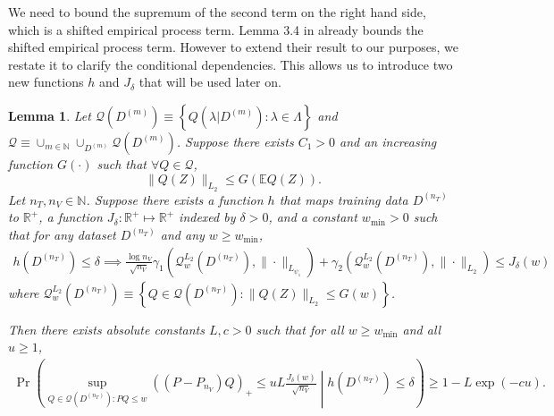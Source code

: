 \documentclass[10pt]{book}
\newtheorem{lemma}{Lemma}
\theoremstyle{definition}
\begin{document}
We need to bound the supremum of the second term on the right hand side, which is a shifted empirical process term.
Lemma 3.4 in \citet{lecue2012oracle} already bounds the shifted empirical process term.
However to extend their result to our purposes, we restate it to clarify the conditional dependencies.
This allows us to introduce two new functions $h$ and $J_\delta$ that will be used later on.
\begin{lemma}
Let $\mathcal{Q}(D^{(m)})\equiv\left\{ Q(\lambda|D^{(m)}):\lambda\in\Lambda\right\} $
and $\mathcal{Q}\equiv\cup_{m\in\mathbb{N}}\cup_{D^{(m)}}\mathcal{Q}(D^{(m)})$.
Suppose there exists $C_{1}>0$ and an increasing function $G(\cdot)$
such that $\forall Q\in\mathcal{Q}$, 
\[
\|Q(Z)\|_{L_{2}}\le G\left(\mathbb{E}Q(Z)\right).
\]
Let $n_{T},n_{V}\in\mathbb{N}$.
Suppose there exists a function $h$ that maps training data $D^{(n_T)}$ to $\mathbb{R}^+$,
a function $J_\delta :\mathbb{R}^+ \mapsto \mathbb{R}^+$ indexed by $\delta > 0$,
and a constant $w_{\min}>0$ such that for any dataset $D^{(n_{T})}$ and any $w \ge w_{\min}$,
\begin{align}
h(D^{(n_{T})})\le\delta\implies\frac{\log n_{V}}{\sqrt{n_{V}}}\gamma_{1}\left(\mathcal{Q}_{w}^{L_{2}}(D^{(n_{T})}),\|\cdot\|_{L_{\psi_{1}}}\right)+\gamma_{2}\left(\mathcal{Q}_{w}^{L_{2}}(D^{(n_{T})}),\|\cdot\|_{L_{2}}\right)\le J_{\delta}(w)
\end{align}
where $\mathcal{Q}_{w}^{L_{2}}(D^{(n_{T})})\equiv\left\{ Q\in\mathcal{Q}(D^{(n_{T})}):\|Q(Z)\|_{L_{2}}\le G(w)\right\}$.

Then there exists absolute constants $L,c>0$ such that for all
$w\ge w_{\min}$ and all $u\ge1$,
\begin{align}
\Pr\left(
\sup_{Q\in\mathcal{Q}(D^{(n_{T})}): PQ \le w}
\left(\left({P}-P_{n_{V}}\right)Q\right)_{+}
\le uL\frac{J_{\delta}(w)}{\sqrt{n_{V}}}
\middle | h\left(D^{(n_{T})}\right)
\le \delta
\right)
\ge
1-L\exp(-cu).
\end{align}
\label{lemma:lecue_prelim}
\end{lemma}
\end{document}
